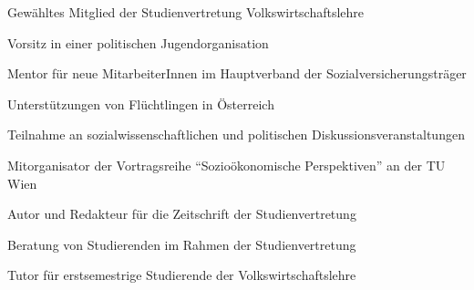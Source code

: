 

	{\begin{cvenumerate}
		\item Gewähltes Mitglied der Studienvertretung Volkswirtschaftslehre
		\item Vorsitz in einer politischen Jugendorganisation
	\end{cvenumerate}}

	{\begin{cvenumerate}
		\item Mentor für neue MitarbeiterInnen im Hauptverband der Sozialversicherungsträger
		\item Unterstützungen von Flüchtlingen in Österreich
		\item Teilnahme an sozialwissenschaftlichen und politischen Diskussionsveranstaltungen
	\end{cvenumerate}}

{\begin{cvenumerate}
		\item Mitorganisator der Vortragsreihe "`Sozioökonomische Perspektiven"' an der TU Wien
		\item Autor und Redakteur für die Zeitschrift der Studienvertretung
		\item Beratung von Studierenden im Rahmen der Studienvertretung
		\item Tutor für erstsemestrige Studierende der Volkswirtschaftslehre
	\end{cvenumerate}}